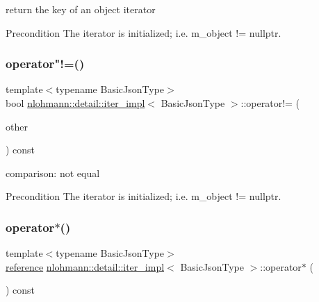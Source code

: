 return the key of an object iterator 

\begin{DoxyPrecond}{Precondition}
The iterator is initialized; i.\+e. {\ttfamily m\+\_\+object != nullptr}. 
\end{DoxyPrecond}
\mbox{\label{classnlohmann_1_1detail_1_1iter__impl_aeab0e2b5da70b3bdebecd5b1a6ee66a6}} 
\subsubsection{\texorpdfstring{operator"!=()}{operator!=()}}
{\footnotesize\ttfamily template$<$typename Basic\+Json\+Type$>$ \\
bool \mbox{\hyperlink{classnlohmann_1_1detail_1_1iter__impl}{nlohmann\+::detail\+::iter\+\_\+impl}}$<$ Basic\+Json\+Type $>$\+::operator!= (\begin{DoxyParamCaption}\item[{const \mbox{\hyperlink{classnlohmann_1_1detail_1_1iter__impl}{iter\+\_\+impl}}$<$ Basic\+Json\+Type $>$ \&}]{other }\end{DoxyParamCaption}) const\hspace{0.3cm}{\ttfamily [inline]}}



comparison\+: not equal 

\begin{DoxyPrecond}{Precondition}
The iterator is initialized; i.\+e. {\ttfamily m\+\_\+object != nullptr}. 
\end{DoxyPrecond}
\mbox{\label{classnlohmann_1_1detail_1_1iter__impl_a5ca57856d9bba54a5fc51cee891de827}} 
\subsubsection{\texorpdfstring{operator$\ast$()}{operator*()}}
{\footnotesize\ttfamily template$<$typename Basic\+Json\+Type$>$ \\
\mbox{\hyperlink{classnlohmann_1_1detail_1_1iter__impl_a5be8001be099c6b82310f4d387b953ce}{reference}} \mbox{\hyperlink{classnlohmann_1_1detail_1_1iter__impl}{nlohmann\+::detail\+::iter\+\_\+impl}}$<$ Basic\+Json\+Type $>$\+::operator$\ast$ (\begin{DoxyParamCaption}{ }\end{DoxyParamCaption}) const\hspace{0.3cm}{\ttfamily [inline]}}



